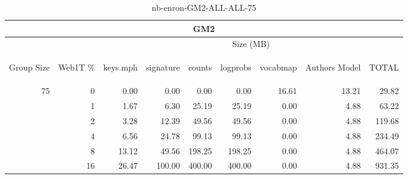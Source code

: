 \begin{center}
\begin{table}[htbp]
\begin{tabular}{ | r | r | r | r | r | r | r | r | r |}
\hline
\multicolumn{9}{|c|}{GM2}\\
\hline
 & & \multicolumn{7}{|c|}{Size (MB)}\\ \cline{3-9}
\begin{sideways}Group Size\end{sideways} & \begin{sideways}Web1T \% \end{sideways} & \begin{sideways}keys.mph\end{sideways} & \begin{sideways}signature\end{sideways} & \begin{sideways}counts\end{sideways} & \begin{sideways}logprobs\end{sideways} & \begin{sideways}vocabmap\end{sideways} & \begin{sideways}Authors Model \end{sideways} & \begin{sideways}TOTAL\end{sideways}\\
\hline
\multirow{5}{*}{75}
 & 0 & 0.00 & 0.00 & 0.00 & 0.00 & 16.61 & 13.21 & 29.82\\ \cline{2-9}
 & 1 & 1.67 & 6.30 & 25.19 & 25.19 & 0.00 & 4.88 & 63.22\\ \cline{2-9}
 & 2 & 3.28 & 12.39 & 49.56 & 49.56 & 0.00 & 4.88 & 119.68\\ \cline{2-9}
 & 4 & 6.56 & 24.78 & 99.13 & 99.13 & 0.00 & 4.88 & 234.49\\ \cline{2-9}
 & 8 & 13.12 & 49.56 & 198.25 & 198.25 & 0.00 & 4.88 & 464.07\\ \cline{2-9}
 & 16 & 26.47 & 100.00 & 400.00 & 400.00 & 0.00 & 4.88 & 931.35\\ \cline{2-9}
\hline
\end{tabular}
\caption{nb-enron-GM2-ALL-ALL-75}
\label{table:nb-enron-GM2-ALL-ALL-75}
\end{table}
\end{center}

